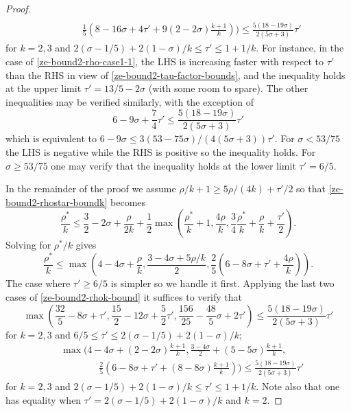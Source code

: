 \begin{proof}
\begin{equation*}
\begin{split}
\\
&\qquad\frac{1}{5}(8 - 16\sigma + 4\tau' + 9(2 - 2\sigma)\frac{k + 1}{k})) \le \frac{5(18 - 19\sigma)}{2(5\sigma + 3)}\tau'
\end{split}
\end{equation*}
for $k = 2, 3$ and $2(\sigma - 1/5) + 2(1-\sigma)/k \le \tau' \le 1 + 1/k$. For instance, in the case of \eqref{ze-bound2-rho-case1-1}, the LHS is increasing faster with respect to $\tau'$ than the RHS in view of \eqref{ze-bound2-tau-factor-bounds}, and the inequality holds at the upper limit $\tau' = 13/5 - 2\sigma$ (with some room to spare). The other inequalities may be verified similarly, with the exception of
\[
6 - 9\sigma + \frac{7}{4}\tau' \le \frac{5(18 - 19\sigma)}{2(5\sigma + 3)}\tau'
\]
which is equivalent to $6 - 9\sigma \le 3(53 - 75\sigma)/(4(5\sigma + 3))\tau'$. For $\sigma < 53/75$ the LHS is negative while the RHS is positive so the inequality holds. For $\sigma \ge 53/75$ one may verify that the inequality holds at the lower limit $\tau' = 6/5$.

In the remainder of the proof we assume $\rho/k  + 1 \ge 5\rho/(4k) + \tau'/2$ so that \eqref{ze-bound2-rhostar-boundk} becomes
\[
\frac{\rho^*}{k} \le \frac{3}{2} - 2\sigma + \frac{\rho}{2k} + \frac{1}{2}\max\left(\frac{\rho^*}{k}+1, \frac{4\rho}{k}, \frac{3}{4}\frac{\rho^*}{k} +\frac{\rho}{k}+\frac{\tau'}{2}\right).
\]
Solving for $\rho^*/k$ gives
\begin{equation}\label{ze-bound2-rho-star-bound}
\frac{\rho^*}{k} \le \max\left(4 - 4\sigma + \frac{\rho}{k}, \frac{3 - 4\sigma + 5\rho/k}{2}, \frac{2}{5}(6 - 8\sigma + \tau' + \frac{4\rho}{k})\right).
\end{equation}
The case where $\tau' \ge 6/5$ is simpler so we handle it first. Applying the last two cases of \eqref{ze-bound2-rhok-bound} it suffices to verify that
\[
\max\left(\frac{32}{5} - 8\sigma + \tau', \frac{15}{2} - 12\sigma + \frac{5}{2}\tau', \frac{156}{25} - \frac{48}{5}\sigma + 2\tau'\right) \le \frac{5(18 - 19\sigma)}{2(5\sigma + 3)}\tau'
\]
for $k = 2, 3$ and $6/5 \le \tau' \le 2(\sigma - 1/5) + 2(1 - \sigma)/k$;
\begin{align*}
&\max(4 - 4\sigma + (2 - 2\sigma)\frac{k + 1}{k}, \frac{3 - 4\sigma}{2} + (5 - 5\sigma)\frac{k + 1}{k}, \\
&\qquad\qquad\frac{2}{5}(6 - 8\sigma + \tau' + (8 - 8\sigma)\frac{k + 1}{k})) \le \frac{5(18 - 19\sigma)}{2(5\sigma + 3)}\tau'
\end{align*}
for $k = 2, 3$ and $2(\sigma - 1/5) + 2(1 - \sigma)/k \le \tau' \le 1 + 1/k$. Note also that one has equality when $\tau' = 2(\sigma - 1/5) + 2(1 - \sigma)/k$ and $k = 2$.


\end{proof}
